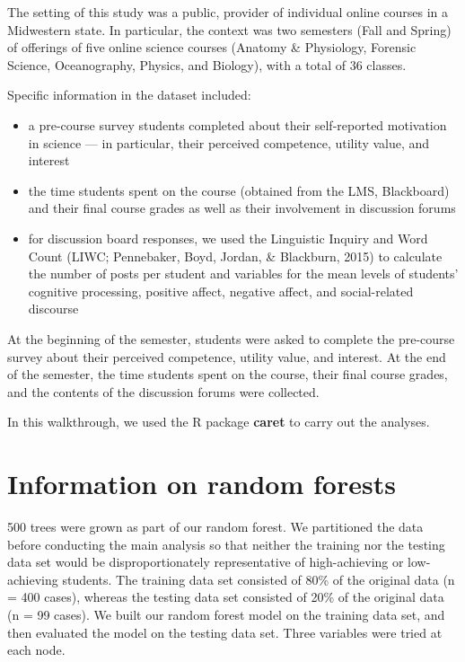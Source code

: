 \documentclass[]{book}
\providecommand{\tightlist}{%
  \setlength{\itemsep}{0pt}\setlength{\parskip}{0pt}}
\begin{document}
The setting of this study was a public, provider of individual online
courses in a Midwestern state. In particular, the context was two
semesters (Fall and Spring) of offerings of five online science courses
(Anatomy \& Physiology, Forensic Science, Oceanography, Physics, and
Biology), with a total of 36 classes.

Specific information in the dataset included:

\begin{itemize}
\tightlist
\item
  a pre-course survey students completed about their self-reported
  motivation in science --- in particular, their perceived competence,
  utility value, and interest
\item
  the time students spent on the course (obtained from the LMS,
  Blackboard) and their final course grades as well as their involvement
  in discussion forums
\item
  for discussion board responses, we used the Linguistic Inquiry and
  Word Count (LIWC; Pennebaker, Boyd, Jordan, \& Blackburn, 2015) to
  calculate the number of posts per student and variables for the mean
  levels of students' cognitive processing, positive affect, negative
  affect, and social-related discourse
\end{itemize}

At the beginning of the semester, students were asked to complete the
pre-course survey about their perceived competence, utility value, and
interest. At the end of the semester, the time students spent on the
course, their final course grades, and the contents of the discussion
forums were collected.

In this walkthrough, we used the R package \textbf{caret} to carry out
the analyses.

\section{Information on random
forests}\label{information-on-random-forests}

500 trees were grown as part of our random forest. We partitioned the
data before conducting the main analysis so that neither the training
nor the testing data set would be disproportionately representative of
high-achieving or low-achieving students. The training data set
consisted of 80\% of the original data (n = 400 cases), whereas the
testing data set consisted of 20\% of the original data (n = 99 cases).
We built our random forest model on the training data set, and then
evaluated the model on the testing data set. Three variables were tried
at each node.
\end{document}
